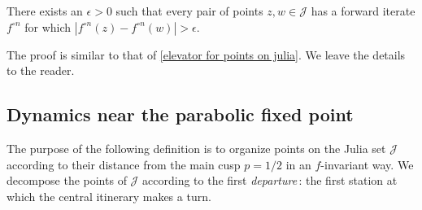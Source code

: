  \begin{lemma} \label{parabolic elevator for points on julia}
	There exists an $\epsilon > 0$ such that 
	every pair of points $z,w\in\mathcal{J}$
	 has a forward iterate $f^{\circ n}$ for which 
$|f^{\circ n}(z)-f^{\circ n}(w)|>\epsilon.$
  \end{lemma}

The proof is similar to that of \cref{elevator for points on julia}. We leave the details to the reader.

\subsection{Dynamics near the parabolic fixed point}

The purpose of the following definition is to organize points on the Julia set $\mathcal J$ according to their distance from the main cusp $p=1/2$ in an $f$-invariant way. We decompose the points of $\mathcal J$ according to the first \emph{departure}\,: the first station at which the central itinerary makes a turn.

